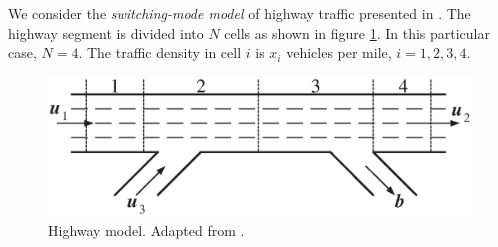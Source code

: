 We  consider the {\it switching-mode model} of highway traffic
presented in \cite{xiaotian}. The highway segment is divided into $N$ cells
as shown in figure \ref{hwfig}. In this particular case, $N=4$.
The traffic density in cell $i$ is  $x_i$ vehicles per mile, $i=1,2,3,4$.
\begin{figure}[htbp]
\centerline{
\includegraphics[height=5 cm]{hw.eps}}
\caption{Highway model. Adapted from \cite{xiaotian}.}
\label{hwfig}
\end{figure}

